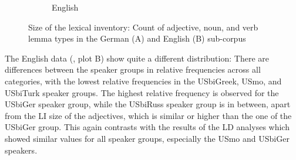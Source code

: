 \documentclass[output=paper,colorlinks,citecolor=brown]{langscibook}
\begin{document}
\begin{figure}[H]
\begin{subfigure}{\textwidth}
    \caption{English}
    \end{subfigure}
    \caption{Size of the lexical inventory: Count of adjective, noun, and verb lemma types in the German (A) and English (B) sub-corpus}
    \label{fig:kelleretal:sizelexicalinventory}
\end{figure}
\vfill\pagebreak

The English data (, plot B) show quite a different distribution: There are differences between the speaker groups in relative frequencies across all categories, with the lowest relative frequencies in the USbiGreek, USmo, and USbiTurk speaker groups. The highest relative frequency is observed for the USbiGer speaker group, while the USbiRuss speaker group is in between, apart from the LI size of the adjectives, which is similar or higher than the one of the USbiGer group. This again contrasts with the results of the LD analyses which showed similar values for all speaker groups, especially the USmo and USbiGer speakers. 
\end{document}
